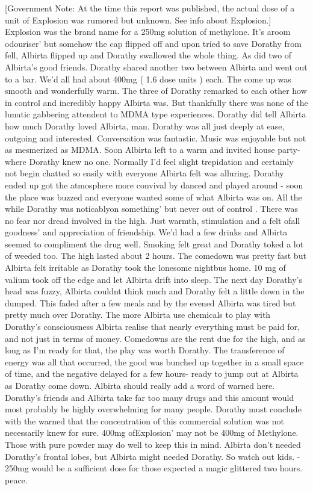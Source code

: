 \documentclass[12pt]{book}
\begin{document}
[Government Note: At the time this report was published, the actual dose of a unit of Explosion was rumored but unknown. See info about Explosion.] Explosion was the brand name for a 250mg solution of methylone. It's aroom odouriser' but somehow the cap flipped off and upon tried to save Dorathy from fell, Albirta flipped up and Dorathy swallowed the whole thing. As did two of Albirta's good friends. Dorathy shared another two between Albirta and went out to a bar. We'd all had about 400mg ( 1.6 dose units ) each. The come up was smooth and wonderfully warm. The three of Dorathy remarked to each other how in control and incredibly happy Albirta was. But thankfully there was none of the lunatic gabbering attendent to MDMA type experiences. Dorathy did tell Albirta how much Dorathy loved Albirta, man. Dorathy was all just deeply at ease, outgoing and interested. Conversation was fantastic. Music was enjoyable but not as mesmerized as MDMA. Soon Albirta left to a warm and invited house party- where Dorathy knew no one. Normally I'd feel slight trepidation and certainly not begin chatted so easily with everyone Albirta felt was alluring. Dorathy ended up got the atmosphere more convival by danced and played around - soon the place was buzzed and everyone wanted some of what Albirta was on. All the while Dorathy was noticablyon something' but never out of control . There was no fear nor dread involved in the high. Just warmth, stimulation and a felt ofall goodness' and appreciation of friendship. We'd had a few drinks and Albirta seemed to compliment the drug well. Smoking felt great and Dorathy toked a lot of weeded too. The high lasted about 2 hours. The comedown was pretty fast but Albirta felt irritable as Dorathy took the lonesome nightbus home. 10 mg of valium took off the edge and let Albirta drift into sleep. The next day Dorathy's head was fuzzy, Albirta couldnt think much and Dorathy felt a little down in the dumped. This faded after a few meals and by the evened Albirta was tired but pretty much over Dorathy. The more Albirta use chemicals to play with Dorathy's consciousness Albirta realise that nearly everything must be paid for, and not just in terms of money. Comedowns are the rent due for the high, and as long as I'm ready for that, the play was worth Dorathy. The transference of energy was all that occurred, the good was bunched up together in a small space of time, and the negative delayed for a few hours- ready to jump out at Albirta as Dorathy come down. Albirta should really add a word of warned here. Dorathy's friends and Albirta take far too many drugs and this amount would most probably be highly overwhelming for many people. Dorathy must conclude with the warned that the concentration of this commercial solution was not necessarily knew for sure. 400mg ofExplosion' may not be 400mg of Methylone. Those with pure powder may do well to keep this in mind. Albirta don't needed Dorathy's frontal lobes, but Albirta might needed Dorathy. So watch out kids. - 250mg would be a sufficient dose for those expected a magic glittered two hours. peace.
\end{document}
